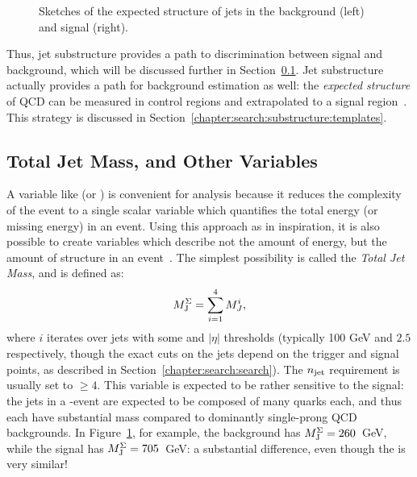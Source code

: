 
\begin{figure}
\centering
{}
\label{fig:search:motivation:event-displays}
\caption{Sketches of the expected structure of \largeR jets in the background (left) and signal (right).}
\end{figure}



Thus, jet substructure provides a path to discrimination between signal and background, which will be discussed further in Section~\ref{chapter:search:substructure:mj}. Jet substructure actually provides a path for background estimation as well: the \textit{expected structure} of QCD can be measured in control regions and extrapolated to a signal region~\cite{MassTemplates}. This strategy is discussed in Section~\ref{chapter:search:substructure:templates}. 

\subsection{Total Jet Mass, and Other Variables}
	\label{chapter:search:substructure:mj}

A variable like \Ht (or \met) is convenient for analysis because it reduces the complexity of the event to a single scalar variable which quantifies the total energy (or missing energy) in an event. Using this approach as in inspiration, it is also possible to create variables which describe not the amount of energy, but the amount of structure in an event~\cite{Hook:2012fd}. The simplest possibility is called the \textit{Total Jet Mass}, and is defined as:
%
\begin{equation}
M_{\textrm{J}}^{\Sigma} = \sum_{i=1}^4 M_J^i,
\end{equation}
%
where $i$ iterates over jets with some \pt and $|\eta|$ thresholds (typically 100 GeV and $2.5$ respectively, though the exact \pt cuts on the jets depend on the trigger and signal points, as described in Section~\ref{chapter:search:search}). The $n_{\rm jet}$ requirement is usually set to $\geq 4$.  This \MJ variable is expected to be rather sensitive to the signal: the \largeR jets in a \gl-\gl event are expected to be composed of many quarks each, and thus each have substantial mass compared to dominantly single-prong QCD backgrounds. In Figure~\ref{fig:search:motivation:event-displays}, for example, the background has $M_{\textrm{J}}^{\Sigma} = 260$~GeV, while the signal has $M_{\textrm{J}}^{\Sigma} = 705$~GeV: a substantial difference, even though the \HT is very similar!

